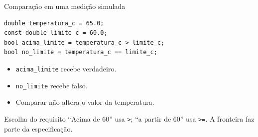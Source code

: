 \begin{frame}[fragile]{Comparação em uma medição simulada}
\begin{lstlisting}
double temperatura_c = 65.0;
const double limite_c = 60.0;
bool acima_limite = temperatura_c > limite_c;
bool no_limite = temperatura_c == limite_c;
\end{lstlisting}
\begin{itemize}
\item \texttt{acima\_limite} recebe verdadeiro.
\item \texttt{no\_limite} recebe falso.
\item Comparar não altera o valor da temperatura.
\end{itemize}
\begin{alertblock}{Escolha do requisito}
``Acima de 60'' usa \texttt{>}; ``a partir de 60'' usa \texttt{>=}. A fronteira faz parte da especificação.
\end{alertblock}
\end{frame}
